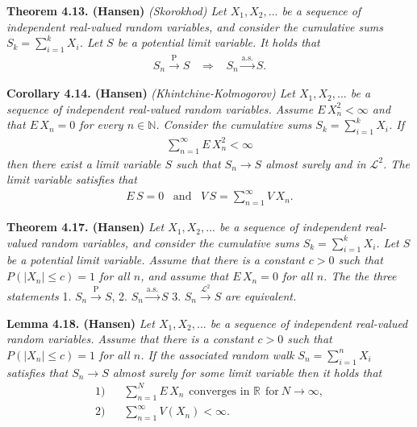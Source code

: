 \documentclass[a4paper,12pt,openany]{book}
\begin{document}
\textbf{Theorem 4.13. (Hansen)} \emph{(Skorokhod) Let \(X_1,X_2,...\) be a sequence of independent real-valued random variables, and consider the cumulative sums \(S_k=\sum_{i=1}^kX_i\). Let \(S\) be a potential limit variable. It holds that}
\begin{align*}
    S_n \stackrel{\text{P}}{\to} S\hspace{10pt}\Rightarrow\hspace{10pt} S_n\stackrel{\text{a.s.}}{\to} S.
\end{align*}

\textbf{Corollary 4.14. (Hansen)} \emph{(Khintchine-Kolmogorov) Let \(X_1,X_2,...\) be a sequence of independent real-valued random variables. Assume \(E\, X_n^2<\infty\) and that \(E\, X_n=0\) for every \(n\in\mathbb{N}\). Consider the cumulative sums \(S_k=\sum_{i=1}^kX_i\). If}
\begin{align*}
    \sum_{n=1}^\infty E\, X_n^2<\infty\tag{4.18}
\end{align*}
\emph{then there exist a limit variable \(S\) such that \(S_n\to S\) almost surely and in \(\mathcal{L}^2\). The limit variable satisfies that}
\begin{align*}
    E\, S=0\hspace{10pt}\text{and}\hspace{10pt}V\, S=\sum_{n=1}^\infty V\, X_n.
\end{align*}

\textbf{Theorem 4.17. (Hansen)} \emph{Let \(X_1,X_2,...\) be a sequence of independent real-valued random variables, and consider the cumulative sums \(S_k=\sum_{i=1}^kX_i\). Let \(S\) be a potential limit variable. Assume that there is a constant \(c>0\) such that \(P(\vert X_n\vert \le c)=1\) for all \(n\), and assume that \(E\, X_n=0\) for all \(n\). The the three statements}
1. \(S_n\stackrel{\text{P}}{\to} S\),
2. \(S_n\stackrel{\text{a.s.}}{\to} S\)
3. \(S_n\stackrel{\mathcal{L}^2}{\to} S\)
\emph{are equivalent.}

\textbf{Lemma 4.18. (Hansen)} \emph{Let \(X_1,X_2,...\) be a sequence of independent real-valued random variables. Assume that there is a constant \(c>0\) such that \(P(\vert X_n\vert \le c)=1\) for all \(n\). If the associated random walk \(S_n=\sum_{i=1}^n X_i\) satisfies that \(S_n\to S\) almost surely for some limit variable then it holds that}
\begin{align}
    \text{1)}\hspace{10pt}& \sum_{n=1}^NE\, X_n\hspace{5pt}\text{converges in }\mathbb{R}\hspace{5pt}\text{for}\ N\to \infty,\\
    \text{2)}\hspace{10pt}&\sum_{n=1}^\infty V(X_n)<\infty.
\end{align}
\end{document}
